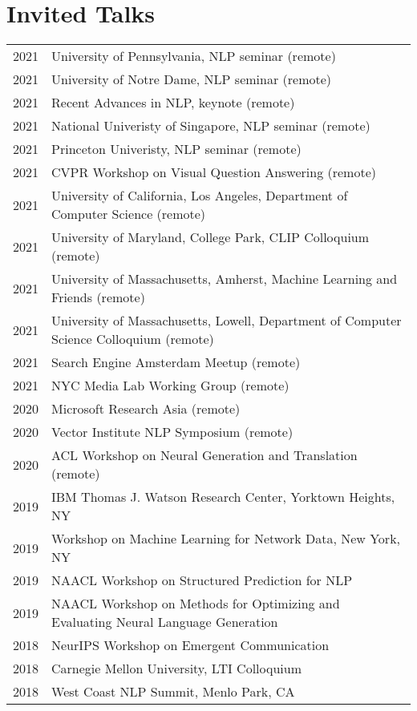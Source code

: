 \documentclass[a4paper,11pt]{article}
\begin{document}
\section{Invited Talks}
\begin{longtable}{rl}
    2021 & University of Pennsylvania, NLP seminar (remote) \\
    2021 & University of Notre Dame, NLP seminar (remote) \\
    2021 & Recent Advances in NLP, keynote (remote) \\
    2021 & National Univeristy of Singapore, NLP seminar (remote) \\
    2021 & Princeton Univeristy, NLP seminar (remote) \\
    2021 & CVPR Workshop on Visual Question Answering (remote) \\
    2021 & University of California, Los Angeles, Department of Computer Science (remote) \\
    2021 & University of Maryland, College Park, CLIP Colloquium (remote) \\
    2021 & University of Massachusetts, Amherst, Machine Learning and Friends (remote) \\
    2021 & University of Massachusetts, Lowell, Department of Computer Science Colloquium (remote) \\
    2021 & Search Engine Amsterdam Meetup (remote) \\
    2021 & NYC Media Lab Working Group (remote) \\
    2020 & Microsoft Research Asia (remote) \\
    2020 & Vector Institute NLP Symposium (remote) \\
    2020 & ACL Workshop on Neural Generation and Translation (remote) \\
    2019 & IBM Thomas J. Watson Research Center, Yorktown Heights, NY \\
    2019 & Workshop on Machine Learning for Network Data, New York, NY \\
    2019 & NAACL Workshop on Structured Prediction for NLP \\
    2019 & NAACL Workshop on Methods for Optimizing and Evaluating Neural Language Generation \\
    2018 & NeurIPS Workshop on Emergent Communication \\
    2018 & Carnegie Mellon University, LTI Colloquium \\
    2018 & West Coast NLP Summit, Menlo Park, CA \\

\end{longtable}
\end{document}
